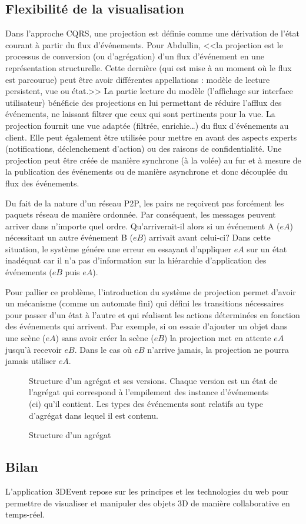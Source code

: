 \subsection{Flexibilité de la visualisation}
\label{sec:flexviz}
Dans l'approche \gls{CQRS}, une projection est définie comme une dérivation de l'état courant à 
partir du flux d'événements. Pour Abdullin, <<la projection est le processus de 
conversion (ou d'agrégation) d'un flux d'événement en une représentation 
structurelle. Cette dernière (qui est mise à au moment où le flux est parcourue) 
peut être avoir différentes appellations : modèle de lecture persistent, vue ou 
état.>>
La partie lecture du modèle (l'affichage sur interface utilisateur) bénéficie des 
projections en lui permettant de réduire l'afflux des événements, ne laissant filtrer 
que ceux qui sont pertinents pour la vue. La projection fournit une vue adaptée 
(filtrée, enrichie\ldots) du flux d'événements au client. Elle peut également être 
utilisée pour mettre en avant des aspects experts (notifications, déclenchement 
d'action) ou des raisons de confidentialité.
Une projection peut être créée de manière synchrone (à la volée) au fur et à 
mesure de la publication des événements ou de manière asynchrone et donc 
découplée du flux des événements. 


Du fait de la nature d'un réseau \gls{P2P}, les pairs ne reçoivent pas forcément les 
paquets réseau de manière ordonnée.
Par conséquent, les messages peuvent arriver dans n'importe quel ordre.
Qu'arriverait-il alors si un événement A ($eA$) nécessitant un autre événement B ($eB$) 
arrivait avant celui-ci? Dans cette situation, le système génére une 
erreur en essayant d'appliquer $eA$ sur un état inadéquat car il n'a pas 
d'information sur la hiérarchie d'application des événements ($eB$ puis $eA$).

Pour pallier ce problème, l'introduction du système de projection permet d'avoir un 
mécanisme (comme un automate fini) qui défini les transitions nécessaires pour 
passer d'un état à l'autre et qui réalisent les actions déterminées en fonction des 
événements qui arrivent. Par exemple, si on essaie d'ajouter un objet dans une 
scène  ($eA$) sans avoir créer la scène ($eB$) la projection met en attente $eA$ 
jusqu'à recevoir $eB$. Dans le cas où $eB$ n'arrive jamais, la projection ne pourra 
jamais utiliser $eA$.

\begin{figure}
	\centering
	\caption{Structure d'un agrégat}{Structure d'un agrégat et ses versions. Chaque 
	version est un état de l'agrégat qui correspond à l'empilement des instance 
	d'événements (ei) qu'il contient. Les types des événements sont relatifs au type 
	d'agrégat dans lequel il est contenu.}
	\label{fig:aggregate}
\end{figure}

\subsection{Bilan}

 L'application 3DEvent repose sur les principes et les 
technologies du web pour permettre de visualiser et manipuler des objets 3D de 
manière 
collaborative en temps-réel.